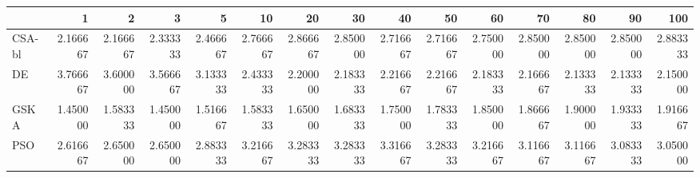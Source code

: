 \begin{tabular}{lrrrrrrrrrrrrrr}
\toprule
{} &       1   &       2   &       3   &       5   &       10  &       20  &       30  &       40  &       50  &       60  &       70  &       80  &       90  &       100 \\
\midrule
CSA-bl &  2.166667 &  2.166667 &  2.333333 &  2.466667 &  2.766667 &  2.866667 &  2.850000 &  2.716667 &  2.716667 &  2.750000 &  2.850000 &  2.850000 &  2.850000 &  2.883333 \\
DE     &  3.766667 &  3.600000 &  3.566667 &  3.133333 &  2.433333 &  2.200000 &  2.183333 &  2.216667 &  2.216667 &  2.183333 &  2.166667 &  2.133333 &  2.133333 &  2.150000 \\
GSKA   &  1.450000 &  1.583333 &  1.450000 &  1.516667 &  1.583333 &  1.650000 &  1.683333 &  1.750000 &  1.783333 &  1.850000 &  1.866667 &  1.900000 &  1.933333 &  1.916667 \\
PSO    &  2.616667 &  2.650000 &  2.650000 &  2.883333 &  3.216667 &  3.283333 &  3.283333 &  3.316667 &  3.283333 &  3.216667 &  3.116667 &  3.116667 &  3.083333 &  3.050000 \\
\bottomrule
\end{tabular}
